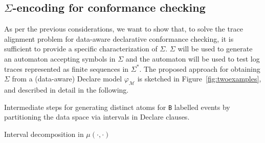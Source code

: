 

\subsection{$\Sigma$-encoding for conformance checking}\label{sec:dadtap}
As per the previous considerations, we want to show that, to solve the trace alignment problem for data-aware declarative conformance checking, it is sufficient to provide a specific characterization of $\Sigma$. $\Sigma$ will be used to generate an automaton accepting symbols in $\Sigma$ and the automaton will be used to test log traces represented as finite sequences in $\Sigma^*$. The proposed approach for obtaining $\Sigma$ from a (data-aware) Declare model $\varphi_{\mathcal{M}}$ is sketched in Figure~\ref{fig:twoexamples}, and described in detail in the following.

\begin{table}[!t]
	\centering
	\captionsetup[subtable]{position = below}
	\captionsetup[table]{position=top}
	\caption{Intermediate steps for generating distinct atoms for \texttt{B} labelled events by partitioning the data space via intervals in Declare clauses.}
	\begin{subtable}{0.45\linewidth}
		\centering
		\caption{Interval decomposition in $\mu(\cdot, \cdot)$}
		\label{tab:dimFFT}
	\end{subtable}\quad
	\begin{subtable}{0.6\linewidth}
		\centering
		\caption{Atom generations for \texttt{B} by data space partitioning via $\times_{k\in K}\mu(\texttt{B},k)$}
		\label{tab:dimGMM}
	\end{subtable}
\end{table}

